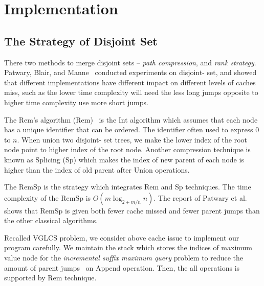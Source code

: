 \section{Implementation}
\label{sec:Implementation}

\subsection{The Strategy of Disjoint Set}

There two methods to merge disjoint sets -- {\em path compression}, and
{\em rank strategy}.  Patwary, Blair, and
Manne~\cite{Patwary2010ExperimentsOU} conducted experiments on disjoint-
set, and showed that different implementations have different impact on
different levels of caches miss, such as the lower time complexity will
need the less long jumps opposite to higher time complexity use more
short jumps. %


The Rem's algorithm ({\sc Rem})~\cite{dijkstra1976a} is the {\sc Int}
algorithm which assumes that each node has a unique identifier that can
be ordered.  The identifier often used to express $0$ to $n$.  When
union two disjoint- set trees, we make the lower index of the root node
point to higher index of the root node. Another compression technique is
known as {\sc Splicing} ({\sc Sp}) which makes the index of new parent
of each node is higher than the index of old parent after {\sc Union}
operations.

The {\sc RemSp} is the strategy which integrates {\sc Rem} and {\sc Sp}
techniques.  The time complexity of the {\sc RemSp} is $O(m \log_{2+m/n}
n)$.  The report of Patwary et al.~\cite{Patwary2010ExperimentsOU} shows
that {\sc RemSp} is given both fewer cache missed and fewer parent jumps
than the other classical algorithms.

Recalled VGLCS problem, we consider above cache issue to implement our
program carefully.  We maintain the stack which stores the indices of
maximum value node for the {\em incremental suffix maximum query}
problem to reduce the amount of parent jumps~\cite{Peng2011TheLC} on {\sc
Append} operation.  Then, the all operations is supported by {\sc Rem}
technique.

\iffalse
運行 VGLCS 時，將耗費 $\theta(n^2)$ 的內存空間。使用遞增後綴最大值 (ISMQ) 時，
採用並查集實作將會遭遇到很多不平衡的工作負載，其原因在於合併的策略，
常見的有路徑壓縮和啟發式合併兩種策略，這間接影響到不同次數的分枝判斷。
實務上須考慮到快取未中
\fi


